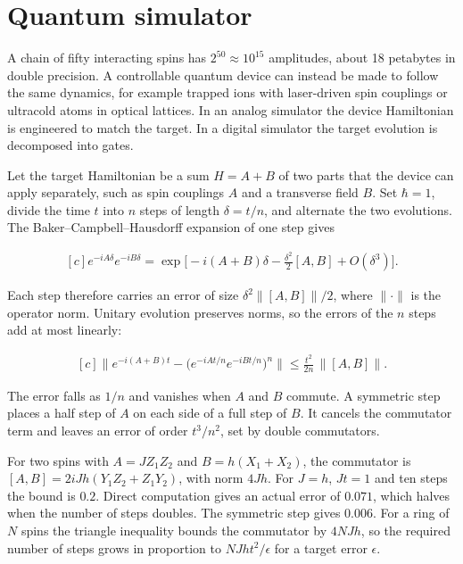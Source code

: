 \documentclass[11pt,oneside]{book}
\newenvironment{centeredalign}{\[\begin{gathered}[c]}{\end{gathered}\]}
\begin{document}
\clearpage

\section{Quantum simulator}

\label{topic:quantum-simulator}

A chain of fifty interacting spins has \(2^{50}\approx10^{15}\) amplitudes, about 18 petabytes in double precision. A controllable quantum device can instead be made to follow the same dynamics, for example trapped ions with laser-driven spin couplings or ultracold atoms in optical lattices. In an analog simulator the device Hamiltonian is engineered to match the target. In a digital simulator the target evolution is decomposed into gates.

Let the target Hamiltonian be a sum \(H=A+B\) of two parts that the device can apply separately, such as spin couplings \(A\) and a transverse field \(B\). Set \(\hbar=1\), divide the time \(t\) into \(n\) steps of length \(\delta=t/n\), and alternate the two evolutions. The Baker--Campbell--Hausdorff expansion of one step gives

\begin{centeredalign}
e^{-iA\delta}e^{-iB\delta}=\exp\!\Big[-i(A+B)\delta-\frac{\delta^2}{2}[A,B]+O(\delta^3)\Big].
\end{centeredalign}

Each step therefore carries an error of size \(\delta^2\|[A,B]\|/2\), where \(\|\cdot\|\) is the operator norm. Unitary evolution preserves norms, so the errors of the \(n\) steps add at most linearly:

\begin{centeredalign}
\Big\|e^{-i(A+B)t}-\big(e^{-iAt/n}e^{-iBt/n}\big)^n\Big\|\leq\frac{t^2}{2n}\,\big\|[A,B]\big\|.
\end{centeredalign}

The error falls as \(1/n\) and vanishes when \(A\) and \(B\) commute. A symmetric step places a half step of \(A\) on each side of a full step of \(B\). It cancels the commutator term and leaves an error of order \(t^3/n^2\), set by double commutators.

For two spins with \(A=JZ_1Z_2\) and \(B=h(X_1+X_2)\), the commutator is \([A,B]=2iJh(Y_1Z_2+Z_1Y_2)\), with norm \(4Jh\). For \(J=h\), \(Jt=1\) and ten steps the bound is \(0.2\). Direct computation gives an actual error of \(0.071\), which halves when the number of steps doubles. The symmetric step gives \(0.006\). For a ring of \(N\) spins the triangle inequality bounds the commutator by \(4NJh\), so the required number of steps grows in proportion to \(NJht^2/\epsilon\) for a target error \(\epsilon\).
\end{document}

